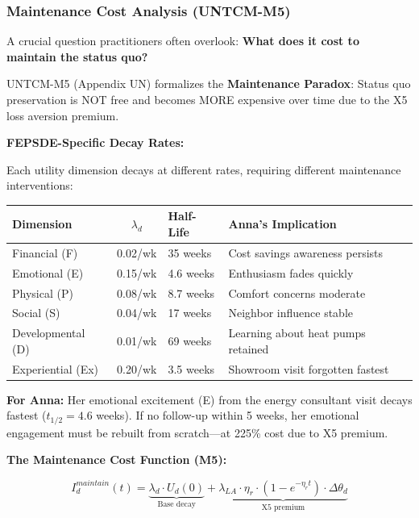 \subsubsection{Maintenance Cost Analysis (UNTCM-M5)}

A crucial question practitioners often overlook: \textbf{What does it cost to maintain the status quo?}

UNTCM-M5 (Appendix UN) formalizes the \textbf{Maintenance Paradox}: Status quo preservation is NOT free and becomes MORE expensive over time due to the X5 loss aversion premium.

\textbf{FEPSDE-Specific Decay Rates:}

Each utility dimension decays at different rates, requiring different maintenance interventions:

\begin{center}
\renewcommand{\arraystretch}{1.2}
\begin{tabular}{@{}lcll@{}}
\toprule
\textbf{Dimension} & \textbf{$\lambda_d$} & \textbf{Half-Life} & \textbf{Anna's Implication} \\
\midrule
Financial (F) & 0.02/wk & 35 weeks & Cost savings awareness persists \\
Emotional (E) & 0.15/wk & 4.6 weeks & Enthusiasm fades quickly \\
Physical (P) & 0.08/wk & 8.7 weeks & Comfort concerns moderate \\
Social (S) & 0.04/wk & 17 weeks & Neighbor influence stable \\
Developmental (D) & 0.01/wk & 69 weeks & Learning about heat pumps retained \\
Experiential (Ex) & 0.20/wk & 3.5 weeks & Showroom visit forgotten fastest \\
\bottomrule
\end{tabular}
\end{center}

\textbf{For Anna:} Her emotional excitement (E) from the energy consultant visit decays fastest ($t_{1/2} = 4.6$ weeks). If no follow-up within 5 weeks, her emotional engagement must be rebuilt from scratch---at 225\% cost due to X5 premium.

\textbf{The Maintenance Cost Function (M5):}

\begin{equation}
I_d^{maintain}(t) = \underbrace{\lambda_d \cdot U_d(0)}_{\text{Base decay}} + \underbrace{\lambda_{LA} \cdot \eta_r \cdot (1 - e^{-\eta_r t}) \cdot \Delta\theta_d}_{\text{X5 premium}}
\end{equation}

